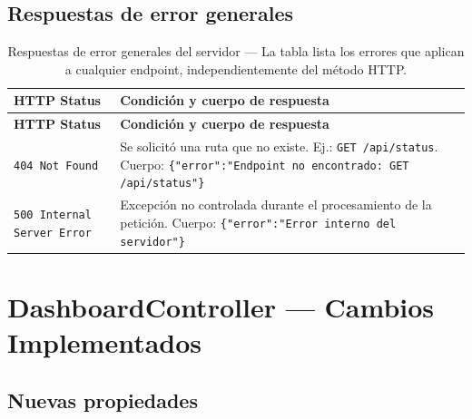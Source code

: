 \documentclass[12pt,a4paper]{article}
\begin{document}
\subsection{Respuestas de error generales}

\begin{longtable}{p{2.5cm} p{11cm}}
\caption{Respuestas de error generales del servidor --- La tabla lista los errores
  que aplican a cualquier endpoint, independientemente del método HTTP.}
\label{tab:errores-generales} \\
\toprule
\textbf{HTTP Status} & \textbf{Condición y cuerpo de respuesta} \\
\midrule
\endfirsthead
\toprule
\textbf{HTTP Status} & \textbf{Condición y cuerpo de respuesta} \\
\midrule
\endhead
\bottomrule
\endlastfoot
\texttt{404 Not Found} &
  Se solicitó una ruta que no existe. Ej.: \texttt{GET /api/status}.
  Cuerpo: \texttt{\{"error":"Endpoint no encontrado: GET /api/status"\}} \\[0.5em]
\texttt{500 Internal Server Error} &
  Excepción no controlada durante el procesamiento de la petición.
  Cuerpo: \texttt{\{"error":"Error interno del servidor"\}} \\
\end{longtable}

\section{DashboardController --- Cambios Implementados}

\subsection{Nuevas propiedades}
\end{document}
